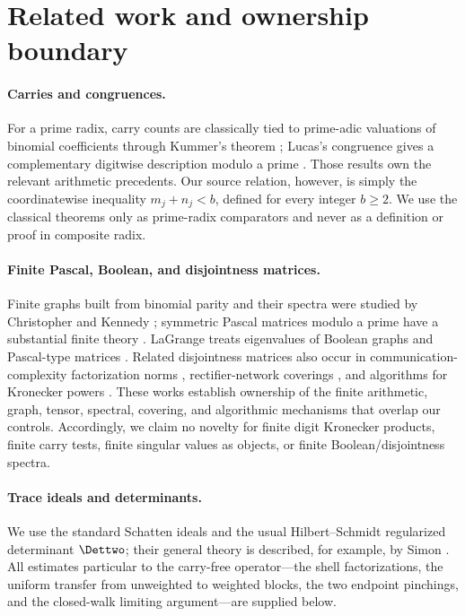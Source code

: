 \section{Related work and ownership boundary}
\label{sec:related}

\paragraph{Carries and congruences.}
For a prime radix, carry counts are classically tied to prime-adic
valuations of binomial coefficients through Kummer's theorem
\cite{kummer1852ergaenzung}; Lucas's congruence gives a complementary
digitwise description modulo a prime \cite{lucas1878congruences}.  Those
results own the relevant arithmetic precedents.  Our source relation,
however, is simply the coordinatewise inequality \(m_j+n_j<b\), defined
for every integer \(b\ge2\).  We use the classical theorems only as
prime-radix comparators and never as a definition or proof in composite
radix.

\paragraph{Finite Pascal, Boolean, and disjointness matrices.}
Finite graphs built from binomial parity and their spectra were studied by
Christopher and Kennedy \cite{christopher1997binomial}; symmetric Pascal
matrices modulo a prime have a substantial finite theory
\cite{bacher2004pascal}.  LaGrange treats eigenvalues of Boolean graphs and
Pascal-type matrices \cite{lagrange2013eigenvalues}.  Related disjointness
matrices also occur in communication-complexity factorization norms
\cite{linial2007factorization}, rectifier-network coverings
\cite{chistikov2017fractional}, and algorithms for Kronecker powers
\cite{alman2023kronecker}.  These works establish ownership of the finite
arithmetic, graph, tensor, spectral, covering, and algorithmic mechanisms
that overlap our controls.  Accordingly, we claim no novelty for finite
digit Kronecker products, finite carry tests, finite singular values as
objects, or finite Boolean/disjointness spectra.

\paragraph{Trace ideals and determinants.}
We use the standard Schatten ideals and the usual Hilbert--Schmidt
regularized determinant \(\Dettwo\); their general theory is described, for
example, by Simon \cite{simon2005trace}.  All estimates particular to the
carry-free operator---the shell factorizations, the uniform transfer from
unweighted to weighted blocks, the two endpoint pinchings, and the
closed-walk limiting argument---are supplied below.

